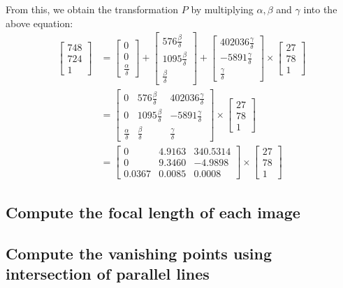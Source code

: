 \documentclass[12pt, oneside]{article}
\begin{document}
From this, we obtain the transformation $P$ by multiplying $\alpha, \beta$ and $\gamma$ into the above equation:
\begin{align*}
  \begin{bmatrix}
748   \\
724   \\
1  
\end{bmatrix}  &= \begin{bmatrix}
0  \\
0   \\
\frac{\alpha}{\delta} 
\end{bmatrix} +
 \begin{bmatrix}
576\frac{\beta}{\delta}  \\
1095 \frac{\beta}{\delta}  \\
\frac{\beta}{\delta}  
\end{bmatrix} +  \begin{bmatrix}
    402036 \frac{\gamma}{\delta} \\
    -5891\frac{\gamma}{\delta} \\
    \frac{\gamma}{\delta}
\end{bmatrix} \times 
\begin{bmatrix}
    27 \\
    78 \\
    1 
\end{bmatrix} \\
 &= \begin{bmatrix}
    0   &  576\frac{\beta}{\delta}  &  402036 \frac{\gamma}{\delta} \\
    0   &  1095 \frac{\beta}{\delta} & -5891\frac{\gamma}{\delta} \\
    \frac{\alpha}{\delta}  &  \frac{\beta}{\delta}   & \frac{\gamma}{\delta}
    \end{bmatrix} 
\times 
    \begin{bmatrix}
        27 \\
        78 \\
        1 
    \end{bmatrix} \\
&= \begin{bmatrix}
    0   &  4.9163   &   340.5314 \\
    0   &  9.3460   &   -4.9898\\
    0.0367   &  0.0085   &   0.0008
    \end{bmatrix} 
\times 
    \begin{bmatrix}
        27 \\
        78 \\
        1 
    \end{bmatrix}
\end{align*} 

\subsection{Compute the focal length of each image}
\subsection{Compute the vanishing points using intersection of parallel lines}
\end{document}
